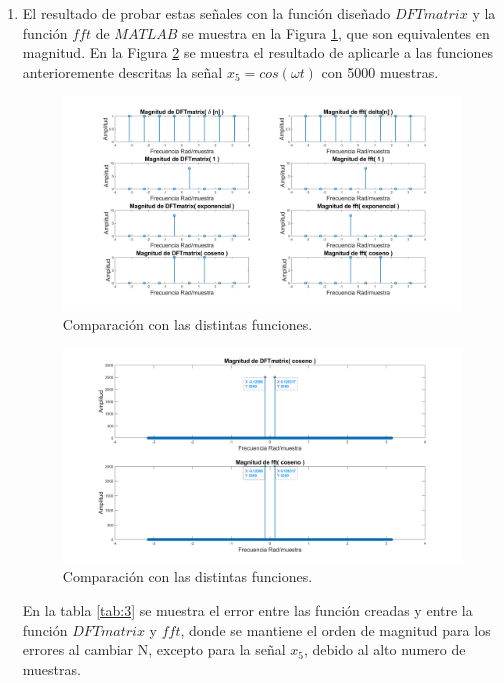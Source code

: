\documentclass[letterpaper,onecolumn,10pt,journal,final]{IEEEtran}
\begin{document}
\begin{enumerate}[1)]
\item %
El resultado de probar estas señales con la función diseñado $DFTmatrix$ y la función $fft$ de $MATLAB$ se muestra en la Figura \ref{V3}, que son equivalentes en magnitud. En la Figura \ref{V3b} se muestra el resultado de aplicarle a las funciones anterioremente descritas la señal $x_5 = cos(\omega t)$ con 5000 muestras.

\begin{figure}[H]
\centering
\includegraphics[width=1 \linewidth]{Figuras/V3.png}
\caption{Comparación con las distintas funciones.}
\label{V3}
\end{figure}
\begin{figure}[H]
\centering
\includegraphics[width=1 \linewidth]{Figuras/V3b.png}
\caption{Comparación con las distintas funciones.}
\label{V3b}
\end{figure}
En la tabla \ref{tab:3} se muestra el error entre las función creadas y entre la función $DFTmatrix$ y $fft$, donde se mantiene el orden de magnitud para los errores al cambiar N, excepto para la señal $x_5$, debido al alto numero de muestras.
\begin{table}[H]

\end{table}
\end{enumerate}
\end{document}
